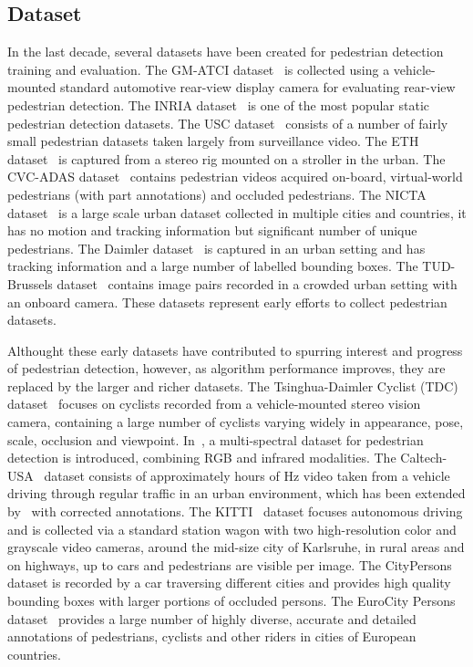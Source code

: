\documentclass[journal]{IEEEtran}
\begin{document}
\subsection{Dataset}

In the last decade, several datasets have been created for pedestrian detection training and evaluation. The GM-ATCI dataset~\cite{DBLP:conf/ivs/SilbersteinLKG14} is collected using a vehicle-mounted standard automotive rear-view display camera for evaluating rear-view pedestrian detection. The INRIA dataset~\cite{DBLP:conf/cvpr/DalalT05} is one of the most popular static pedestrian detection datasets. The USC dataset~\cite{DBLP:conf/iccv/WuN07} consists of a number of fairly small pedestrian datasets taken largely from surveillance video. The ETH dataset~\cite{DBLP:conf/iccv/EssLG07} is captured from a stereo rig mounted on a stroller in the urban. The CVC-ADAS dataset~\cite{geronimo2007adaptive} contains pedestrian videos acquired on-board, virtual-world pedestrians (with part annotations) and occluded pedestrians. The NICTA dataset~\cite{overett2008new} is a large scale urban dataset collected in multiple cities and countries, it has no motion and tracking information but significant number of unique pedestrians. The Daimler dataset~\cite{DBLP:journals/pami/EnzweilerG09} is captured in an urban setting and has tracking information and a large number of labelled bounding boxes. The TUD-Brussels dataset~\cite{DBLP:conf/cvpr/WojekWS09} contains image pairs recorded in a crowded urban setting with an onboard camera. These datasets represent early efforts to collect pedestrian datasets.

Althought these early datasets have contributed to spurring interest and progress of pedestrian detection, however, as algorithm performance improves, they are replaced by the larger and richer datasets. The Tsinghua-Daimler Cyclist (TDC) dataset~\cite{DBLP:conf/ivs/LiFYXBPLG16} focuses on cyclists recorded from a vehicle-mounted stereo vision camera, containing a large number of cyclists varying widely in appearance, pose, scale, occlusion and viewpoint. In~\cite{DBLP:conf/cvpr/HwangPKCK15}, a multi-spectral dataset for pedestrian detection is introduced, combining RGB and infrared modalities. The Caltech-USA~\cite{DBLP:journals/pami/DollarWSP12} dataset consists of approximately  hours of  Hz video taken from a vehicle driving through regular traffic in an urban environment, which has been extended by~\cite{DBLP:journals/pami/ZhangBOHS18} with corrected annotations. The KITTI~\cite{DBLP:conf/cvpr/GeigerLU12} dataset focuses autonomous driving and is collected via a standard station wagon with two high-resolution color and grayscale video cameras, around the mid-size city of Karlsruhe, in rural areas and on highways, up to  cars and  pedestrians are visible per image. The CityPersons~\cite{DBLP:conf/cvpr/ZhangBS17} dataset is recorded by a car traversing  different cities and provides high quality bounding boxes with larger portions of occluded persons. The EuroCity Persons dataset~\cite{DBLP:journals/corr/abs-1805-07193} provides a large number of highly diverse, accurate and detailed annotations of pedestrians, cyclists and other riders in  cities of  European countries.
\end{document}
